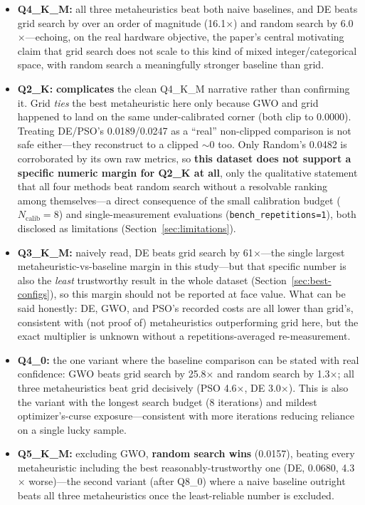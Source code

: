 \documentclass[journal]{IEEEtran}
\begin{document}
\begin{itemize}
  \item \textbf{Q4\_K\_M:} all three metaheuristics beat both naive baselines, and DE beats grid search by over an order of magnitude (16.1$\times$) and random search by 6.0$\times$---echoing, on the real hardware objective, the paper's central motivating claim that grid search does not scale to this kind of mixed integer/categorical space, with random search a meaningfully stronger baseline than grid.
  \item \textbf{Q2\_K:} \textbf{complicates} the clean Q4\_K\_M narrative rather than confirming it. Grid \emph{ties} the best metaheuristic here only because GWO and grid happened to land on the same under-calibrated corner (both clip to 0.0000). Treating DE/PSO's 0.0189/0.0247 as a ``real'' non-clipped comparison is not safe either---they reconstruct to a clipped $\sim$0 too. Only Random's 0.0482 is corroborated by its own raw metrics, so \textbf{this dataset does not support a specific numeric margin for Q2\_K at all}, only the qualitative statement that all four methods beat random search without a resolvable ranking among themselves---a direct consequence of the small calibration budget ($N_{\text{calib}}=8$) and single-measurement evaluations (\texttt{bench\_repetitions=1}), both disclosed as limitations (Section~\ref{sec:limitations}).
  \item \textbf{Q3\_K\_M:} naively read, DE beats grid search by 61$\times$---the single largest metaheuristic-vs-baseline margin in this study---but that specific number is also the \emph{least} trustworthy result in the whole dataset (Section~\ref{sec:best-configs}), so this margin should not be reported at face value. What can be said honestly: DE, GWO, and PSO's recorded costs are all lower than grid's, consistent with (not proof of) metaheuristics outperforming grid here, but the exact multiplier is unknown without a repetitions-averaged re-measurement.
  \item \textbf{Q4\_0:} the one variant where the baseline comparison can be stated with real confidence: GWO beats grid search by 25.8$\times$ and random search by 1.3$\times$; all three metaheuristics beat grid decisively (PSO 4.6$\times$, DE 3.0$\times$). This is also the variant with the longest search budget (8 iterations) and mildest optimizer's-curse exposure---consistent with more iterations reducing reliance on a single lucky sample.
  \item \textbf{Q5\_K\_M:} excluding GWO, \textbf{random search wins} (0.0157), beating every metaheuristic including the best reasonably-trustworthy one (DE, 0.0680, 4.3$\times$ worse)---the second variant (after Q8\_0) where a naive baseline outright beats all three metaheuristics once the least-reliable number is excluded.

\end{itemize}
\end{document}
